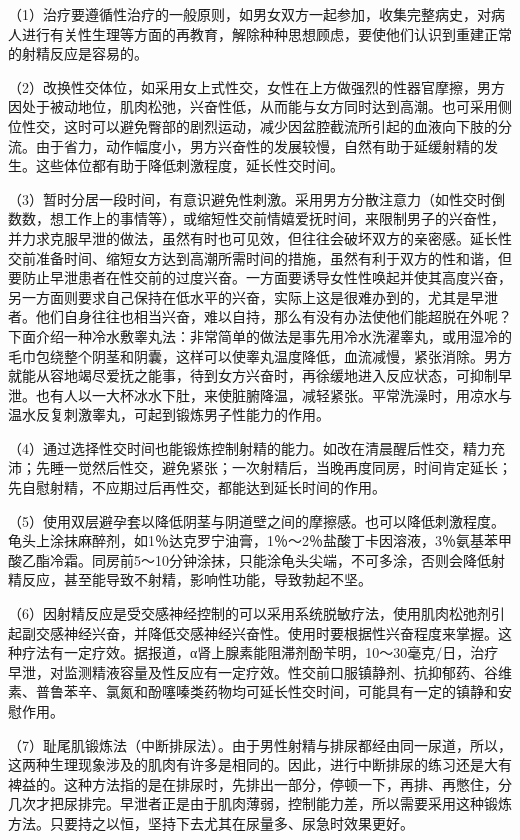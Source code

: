（1）治疗要遵循性治疗的一般原则，如男女双方一起参加，收集完整病史，对病人进行有关性生理等方面的再教育，解除种种思想顾虑，要使他们认识到重建正常的射精反应是容易的。

（2）改换性交体位，如采用女上式性交，女性在上方做强烈的性器官摩擦，男方因处于被动地位，肌肉松弛，兴奋性低，从而能与女方同时达到高潮。也可采用侧位性交，这时可以避免臀部的剧烈运动，减少因盆腔截流所引起的血液向下肢的分流。由于省力，动作幅度小，男方兴奋性的发展较慢，自然有助于延缓射精的发生。这些体位都有助于降低刺激程度，延长性交时间。

（3）暂时分居一段时间，有意识避免性刺激。采用男方分散注意力（如性交时倒数数，想工作上的事情等），或缩短性交前情嬉爱抚时间，来限制男子的兴奋性，并力求克服早泄的做法，虽然有时也可见效，但往往会破坏双方的亲密感。延长性交前准备时间、缩短女方达到高潮所需时间的措施，虽然有利于双方的性和谐，但要防止早泄患者在性交前的过度兴奋。一方面要诱导女性性唤起并使其高度兴奋，另一方面则要求自己保持在低水平的兴奋，实际上这是很难办到的，尤其是早泄者。他们自身往往也相当兴奋，难以自持，那么有没有办法使他们能超脱在外呢？下面介绍一种冷水敷睾丸法：非常简单的做法是事先用冷水洗濯睾丸，或用湿冷的毛巾包绕整个阴茎和阴囊，这样可以使睾丸温度降低，血流减慢，紧张消除。男方就能从容地竭尽爱抚之能事，待到女方兴奋时，再徐缓地进入反应状态，可抑制早泄。也有人以一大杯冰水下肚，来使脏腑降温，减轻紧张。平常洗澡时，用凉水与温水反复刺激睾丸，可起到锻炼男子性能力的作用。

（4）通过选择性交时间也能锻炼控制射精的能力。如改在清晨醒后性交，精力充沛；先睡一觉然后性交，避免紧张；一次射精后，当晚再度同房，时间肯定延长；先自慰射精，不应期过后再性交，都能达到延长时间的作用。

（5）使用双层避孕套以降低阴茎与阴道壁之间的摩擦感。也可以降低刺激程度。龟头上涂抹麻醉剂，如1％达克罗宁油膏，1％～2％盐酸丁卡因溶液，3％氨基苯甲酸乙酯冷霜。同房前5～10分钟涂抹，只能涂龟头尖端，不可多涂，否则会降低射精反应，甚至能导致不射精，影响性功能，导致勃起不坚。

（6）因射精反应是受交感神经控制的可以采用系统脱敏疗法，使用肌肉松弛剂引起副交感神经兴奋，并降低交感神经兴奋性。使用时要根据性兴奋程度来掌握。这种疗法有一定疗效。据报道，α肾上腺素能阻滞剂酚苄明，10～30毫克/日，治疗早泄，对监测精液容量及性反应有一定疗效。性交前口服镇静剂、抗抑郁药、谷维素、普鲁苯辛、氯氮和酚噻嗪类药物均可延长性交时间，可能具有一定的镇静和安慰作用。

（7）耻尾肌锻炼法（中断排尿法）。由于男性射精与排尿都经由同一尿道，所以，这两种生理现象涉及的肌肉有许多是相同的。因此，进行中断排尿的练习还是大有裨益的。这种方法指的是在排尿时，先排出一部分，停顿一下，再排、再憋住，分几次才把尿排完。早泄者正是由于肌肉薄弱，控制能力差，所以需要采用这种锻炼方法。只要持之以恒，坚持下去尤其在尿量多、尿急时效果更好。

